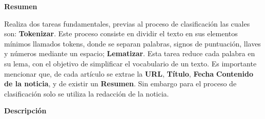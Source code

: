 
\begin{large}
	\textbf{Resumen}\\
\end{large}

Realiza dos tareas fundamentales, previas al proceso de clasificación las cuales son: \textbf{Tokenizar}. Este proceso consiste en dividir el texto en sus elementos mínimos llamados tokens, donde se separan palabras, signos de puntuación, llaves y números mediante un espacio; \textbf{Lematizar}. Esta tarea reduce cada palabra en su lema, con el objetivo de simplificar el vocabulario de un texto. Es importante mencionar que, de cada artículo se extrae la \textbf{URL}, \textbf{Título}, \textbf{Fecha} \textbf{Contenido de la noticia}, y de existir un \textbf{Resumen}. Sin embargo para el proceso de clasificación solo se utiliza la redacción de la noticia.\\ 


\begin{large}
	\textbf{Descripción}\\
\end{large} 



